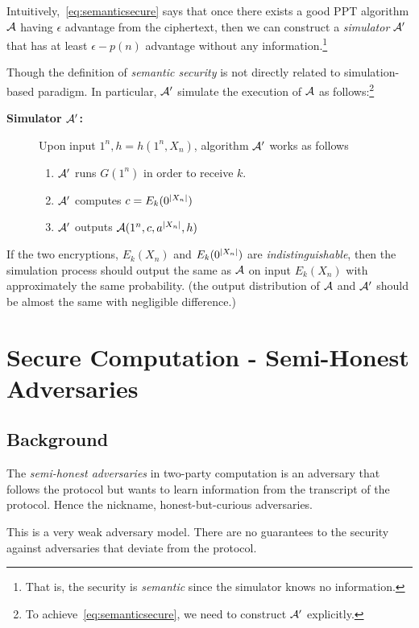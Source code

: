 Intuitively,~\eqref{eq:semanticsecure} says that once there exists a good PPT algorithm $\mathcal{A}$ having $\epsilon$ advantage from the ciphertext, then we can construct a \textit{simulator} $\mathcal{A}'$ that has at least $\epsilon-p(n)$ advantage without any information.\footnote{That is, the security is \textit{semantic} since the simulator knows no information.}

Though the definition of {\it semantic security} is not directly related to simulation-based paradigm. In particular, $\mathcal{A}'$ simulate the execution of $\mathcal{A}$ as follows:\footnote{To achieve~\eqref{eq:semanticsecure}, we need to construct $\mathcal{A}'$ explicitly.}
\begin{description}
    \item [\bf Simulator $\mathcal{A}'$:] Upon input $1^n,h=h(1^n,X_n)$, algorithm $\mathcal{A}'$ works as follows
    \begin{enumerate}
        \item $\mathcal{A}'$ runs $G(1^n)$ in order to receive $k$.
        \item $\mathcal{A}'$ computes $c=E_k(0^{\left|X_n\right|})$
        \item $\mathcal{A}'$ outputs $\mathcal{A}(1^n,c,a^{\left|X_n\right|},h)$
    \end{enumerate}
\end{description}
If the two encryptions, $E_k(X_n)$ and $E_k(0^{\left|X_n\right|})$ are {\it indistinguishable}, then the simulation process should output the same as $\mathcal{A}$ on input $E_k(X_n)$ with approximately the same probability. (the output distribution of $\mathcal{A}$ and $\mathcal{A}'$ should be almost the same with negligible difference.)
\section{Secure Computation - Semi-Honest Adversaries}
\subsection{Background}
The {\it semi-honest adversaries} in two-party computation is an adversary that follows the protocol but wants to learn information from the transcript of the protocol. Hence the nickname, honest-but-curious adversaries. 
\begin{remark}
    This is a very weak adversary model. There are no guarantees to the security against adversaries that deviate from the protocol.
\end{remark}

